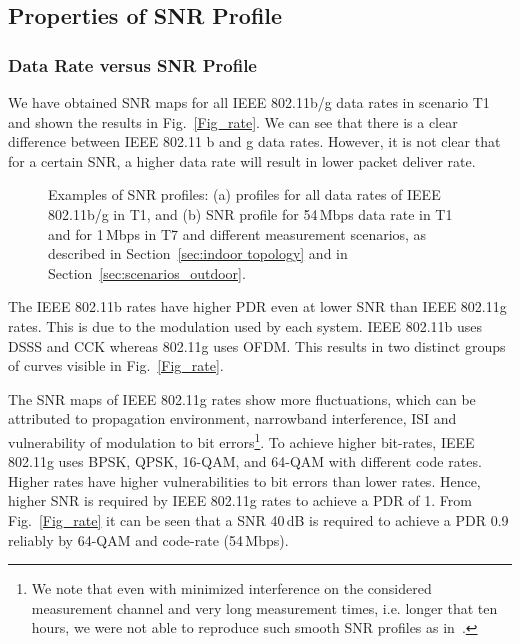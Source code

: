 \documentclass[11pt,draftclsnofoot,journal,onecolumn]{IEEEtran}
\begin{document}
\subsection{Properties of SNR Profile}
\label{sec:lqe_evaluation}

\subsubsection{Data Rate versus SNR Profile}

We have obtained SNR maps for all IEEE 802.11b/g data rates in scenario T1 and shown the results in Fig.~\ref{Fig_rate}. We can see that there is a clear difference between IEEE 802.11 b and g data rates. However, it is not clear that for a certain SNR, a higher data rate will result in lower packet deliver rate.
\begin{figure}
\centering
{}
\caption{Examples of SNR profiles: (a) profiles for all data rates of IEEE 802.11b/g in T1, and (b) SNR profile for 54\,Mbps data rate in T1 and for 1\,Mbps in T7 and different measurement scenarios, as described in Section~\ref{sec:indoor topology} and in Section~\ref{sec:scenarios_outdoor}.}
\end{figure}

The IEEE 802.11b rates have higher PDR even at lower SNR than IEEE 802.11g rates. This is due to the modulation used by each system. IEEE 802.11b uses DSSS and CCK whereas 802.11g uses OFDM. This results in two distinct groups of curves visible in Fig.~\ref{Fig_rate}.

The SNR maps of IEEE 802.11g rates show more fluctuations, which can be attributed to propagation environment, narrowband interference, ISI and vulnerability of modulation to bit errors\footnote{We note that even with minimized interference on the considered measurement channel and very long measurement times, i.e. longer that ten hours, we were not able to reproduce such smooth SNR profiles as in~\cite[Fig. 2, Fig. 5]{Zhang_Infocom_2008}.}. To achieve higher bit-rates, IEEE 802.11g uses BPSK, QPSK, 16-QAM, and 64-QAM with different code rates. Higher rates have higher vulnerabilities to bit errors than lower rates. Hence, higher SNR is required by IEEE 802.11g rates to achieve a PDR of 1. From Fig.~\ref{Fig_rate} it can be seen that a SNR  40\,dB is required to achieve a PDR  0.9 reliably by 64-QAM and code-rate  (54\,Mbps).
\end{document}
